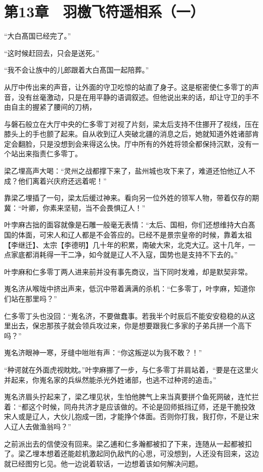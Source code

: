 \section{第13章　羽檄飞符遥相系（一）}

“大白髙国已经完了。”

“这时候赶回去，只会是送死。”

“我不会让族中的儿郎跟着大白髙国一起陪葬。”

从厅中传出来的声音，让外面的守卫吃惊的站直了身子。这是枢密使仁多零丁的声音，没有丝毫激动，只是在用平静的语调叙述。但他说出来的话，却让守卫的手不由自主的握紧了腰间的刀柄，

与磐石般立在大厅中央的仁多零丁对视了片刻，梁太后支持不住挪开了视线，压在膝头上的手也颤了起来。自从收到辽人突破北疆的消息之后，她就知道外姓诸部肯定会翻脸，只是没想到会来得这么快。厅中所有的外姓将领全都保持沉默，没有一个站出来指责仁多零丁。

梁乙埋高声大喝：“灵州之战都撑下来了，盐州城也攻下来了，难道还怕他辽人不成？他们离着兴庆府还远着呢！”

靠梁乙埋插了一句，梁太后缓过神来。看向另一位外姓的领军人物，带着仅存的期冀：“叶卿，你素来坚韧，当不会畏惧辽人！”

叶孛麻古拙的面容就像是石雕一般毫无表情：“太后、国相，你们还想维持大白髙国的体面，可宋人和辽人都是不会答应的。已经不是景宗皇帝的时候，靠着太祖【李继迁】、太宗【李德明】几十年的积累，南破大宋，北克大辽。这十几年，一点家底都消耗得一干二净，如今就是辽人不入寇，国势也是支持不下去的。”

叶孛麻和仁多零丁两人进来前并没有事先商议，当下同时发难，却是默契非常。

嵬名济从喉咙中挤出声来，低沉中带着满满的杀机：“仁多零丁，叶孛麻，知道你们站在那里吗？”

仁多零丁头也没回：“嵬名济，不要做蠢事。若我半个时辰后不能安安稳稳的从这里出去，保忠那孩子就会领兵攻过来，你是想要跟我仁多家的子弟兵拼一个高下吗？”

嵬名济眼神一寒，牙缝中咝咝有声：“你这叛逆以为我不敢？！”

“种谔就在外面虎视眈眈。”叶孛麻挪了一步，与仁多零丁并肩站着，“要是在这里火并起来，你嵬名家的兵纵然能杀光外姓诸部，也逃不过种谔的追击。”

嵬名济眉头拧起来了，梁乙埋见状，生怕他脾气上来当真要拼个鱼死网破，连忙拦着：“都这个时候，同舟共济才是应该做的。不论是回师抵挡辽师，还是干脆投效宋人或是辽人，大伙儿抱成一团，才能挣个体面。否则你打我，我打你，不是让宋人辽人去做渔翁吗？”

之前派出去的信使没有回来。梁乙逋和仁多瀚都被扣了下来，连随从一起都被扣了。梁乙埋本想着还能趁机激起同仇敌忾的心思，可没想到，人还没有回来，这边就已经图穷匕见。他一边说着软话，一边想着该如何解决问题。

